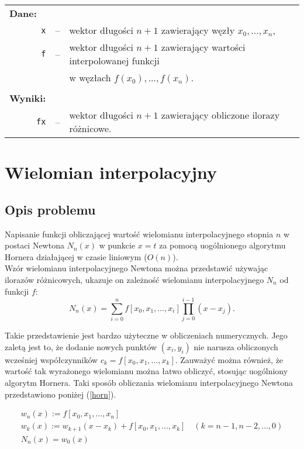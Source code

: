 \documentclass[11pt]{mk-polish-lab-report}
\begin{document}
\begin{longtable}[l]{r  c  l}
\multicolumn{1}{l}{\textbf{Dane:}}&& \\
\texttt{x}&--&wektor długości $n+1$ zawierający węzły $x_0, \ldots, x_n$, \\
\texttt{f}&--&wektor długości $n+1$ zawierający wartości interpolowanej funkcji \\
&&w węzłach $f(x_0), \ldots, f(x_n)$. \\
&& \\
\multicolumn{1}{l}{\textbf{Wyniki:}}&& \\
\texttt{fx}&--&wektor długości $n+ 1$ zawierający obliczone ilorazy różnicowe. \\
\end{longtable}

\section{Wielomian interpolacyjny}

\subsection{Opis problemu}
Napisanie funkcji obliczającej wartość wielomianu interpolacyjnego stopnia $n$ w postaci Newtona $N_{n}(x)$ w punkcie $x = t$ za pomocą uogólnionego algorytmu Hornera działającej w czasie liniowym ($O(n)$). \\

\noindent Wzór wielomianu interpolacyjnego Newtona można przedstawić używając ilorazów różnicowych, ukazuje on zależność wielomianu interpolacyjnego $N_n$ od funkcji $f$:
$$N_n(x) = \sum_{i=0}^n f[x_0,x_{1}, \ldots, x_{i}] \prod_{j=0}^{i-1}(x-x_j).$$

\noindent Takie przedstawienie jest bardzo użyteczne w obliczeniach numerycznych. Jego zaletą jest to, że dodanie nowych punktów $(x_i, y_i)$ nie narusza obliczonych wcześniej współczynników $c_k=f[x_0,x_1, \ldots, x_k]$. Zauważyć można również, że wartość tak wyrażonego wielomianu można łatwo obliczyć, stosując uogólniony algorytm Hornera. Taki sposób obliczania wielomianu interpolacyjnego Newtona przedstawiono poniżej (\ref{horn}).   		
		
		\begin{align}
		\label{horn}
			&w_n(x) := f[x_0, x_1, \ldots, x_n]& \nonumber \\
			&w_k(x) := w_{k+1}(x-x_k)+ f[x_0, x_1, \ldots, x_k]	\quad(k=n-1, n-2, \ldots, 0)& \nonumber \\
			&N_n(x) = w_0(x) \nonumber \\
		\end{align}
\end{document}
